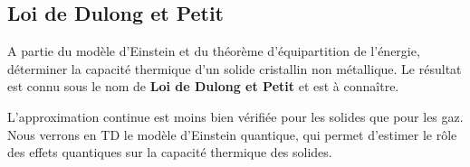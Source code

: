 \documentclass[11pt,fleqn]{book} %
\begin{document}
\subsection{Loi de Dulong et Petit}

\begin{capex}
	A partie du modèle d'Einstein et du théorème d'équipartition de l'énergie, déterminer la capacité thermique d'un solide cristallin non métallique. Le résultat est connu sous le nom de \textbf{Loi de Dulong et Petit} et est à connaître.
\end{capex}

\begin{remark}
	L'approximation continue est moins bien vérifiée pour les solides que pour les gaz. Nous verrons en TD le modèle d'Einstein quantique, qui permet d'estimer le rôle des effets quantiques sur la capacité thermique des solides.
\end{remark}
\end{document}
